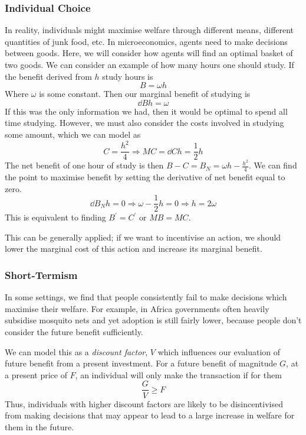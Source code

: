 \documentclass[12pt]{report}
\begin{document}
\begin{flushleft}
\subsubsection*{Individual Choice}
In reality, individuals might maximise welfare through different means,
different quantities of junk food, etc. In microeconomics, agents need to make
decisions between goods. Here, we will consider how agents will find an optimal
basket of two goods. We can consider an example of how many hours one should
study. If the benefit derived from \(h\) study hours is
\[B = \omega h\]
Where \(\omega\) is some constant. Then our marginal benefit of studying is
\[\dd{B}{h} = \omega\]
If this was the only information we had, then it would be optimal to spend all
time studying. However, we must also consider the costs involved in studying
some amount, which we can model as
\[C = \frac{h^2}{4} \Rightarrow MC = \dd{C}{h} = \frac{1}{2}h\]
The net benefit of one hour of study is then
\(B - C = B_N = \omega h - \frac{h^2}{4}\).
We can find the point to maximise benefit by setting the derivative of net
benefit equal to zero.
\[\dd{B_N}{h} = 0 \Rightarrow \omega - \frac{1}{2}h = 0
\Rightarrow h = 2\omega\]
This is equivalent to finding \(B^\prime = C^\prime\) or \(MB = MC\). \par
This can be generally applied; if we want to incentivise an action, we should
lower the marginal cost of this action and increase its marginal benefit.

\subsubsection*{Short-Termism}
In some settings, we find that people consistently fail to make decisions which
maximise their welfare. For example, in Africa governments often heavily
subsidise mosquito nets and yet adoption is still fairly lower, because people
don't consider the future benefit sufficiently. \par
We can model this as a \textit{discount factor}, \(V\) which influences our
evaluation of future benefit from a present investment. For a future benefit of
magnitude \(G\), at a present price of \(F\), an individual will only make the
transaction if for them
\[\frac{G}{V} \geq F\]
Thus, individuals with higher discount factors are likely to be disincentivised
from making decisions that may appear to lead to a large increase in welfare for
them in the future.
\end{flushleft}
\end{document}
